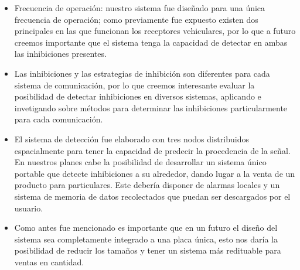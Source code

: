 \begin{itemize}
    \item Frecuencia de operación: nuestro sistema fue diseñado para una única frecuencia de operación; como previamente fue
    expuesto existen dos principales en las que funcionan los receptores vehiculares, por lo que a futuro creemos importante
    que el sistema tenga la capacidad de detectar en ambas las inhibiciones presentes.
    \item Las inhibiciones y las estrategias de inhibición son diferentes para cada sistema de comunicación, por lo que creemos 
    interesante evaluar la posibilidad de detectar inhibiciones en diversos sistemas, aplicando e invetigando
    sobre métodos para determinar las inhibiciones particularmente para cada comunicación.
    \item El sistema de detección fue elaborado con tres nodos distribuidos espacialmente para tener la capacidad de predecir la
    procedencia de la señal. En nuestros planes cabe la posibilidad de desarrollar un sistema único portable que
    detecte inhibiciones a su alrededor, dando lugar a la venta de un producto para particulares. Este debería disponer de
    alarmas locales y un sistema de memoria de datos recolectados que puedan ser descargados por el usuario.
    
    \item Como antes fue mencionado es importante que en un futuro el diseño del sistema sea completamente integrado a una
    placa única, esto nos daría la posibilidad de reducir los tamaños y tener un sistema más redituable para ventas en cantidad. 

\end{itemize}

